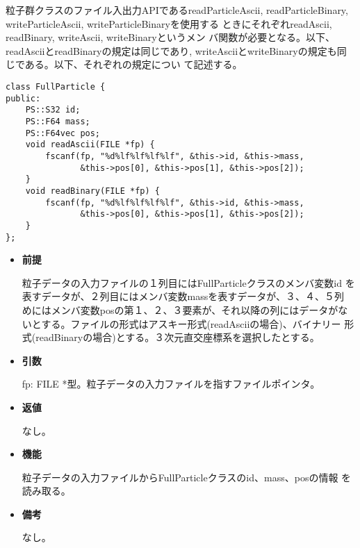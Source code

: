 
粒子群クラスのファイル入出力APIであるreadParticleAscii,
readParticleBinary, writeParticleAscii, writeParticleBinaryを使用する
ときにそれぞれreadAscii, readBinary, writeAscii, writeBinaryというメン
バ関数が必要となる。以下、readAsciiとreadBinaryの規定は同じであり,
writeAsciiとwriteBinaryの規定も同じである。以下、それぞれの規定につい
て記述する。


\begin{screen}
\begin{verbatim}
class FullParticle {
public:
    PS::S32 id;
    PS::F64 mass;
    PS::F64vec pos;
    void readAscii(FILE *fp) {
        fscanf(fp, "%d%lf%lf%lf%lf", &this->id, &this->mass,
               &this->pos[0], &this->pos[1], &this->pos[2]);
    }
    void readBinary(FILE *fp) {
        fscanf(fp, "%d%lf%lf%lf%lf", &this->id, &this->mass,
               &this->pos[0], &this->pos[1], &this->pos[2]);
    }
};
\end{verbatim}
\end{screen}

\begin{itemize}

\item {\bf 前提}

  粒子データの入力ファイルの１列目にはFullParticleクラスのメンバ変数id
  を表すデータが、２列目にはメンバ変数massを表すデータが、３、４、５列
  めにはメンバ変数posの第１、２、３要素が、それ以降の列にはデータがな
  いとする。ファイルの形式はアスキー形式(readAsciiの場合)、バイナリー
  形式(readBinaryの場合)とする。３次元直交座標系を選択したとする。

\item {\bf 引数}

  fp: FILE *型。粒子データの入力ファイルを指すファイルポインタ。
  
\item {\bf 返値}

  なし。
  
\item {\bf 機能}

  粒子データの入力ファイルからFullParticleクラスのid、mass、posの情報
  を読み取る。
  
\item {\bf 備考}

  なし。
  
\end{itemize}

